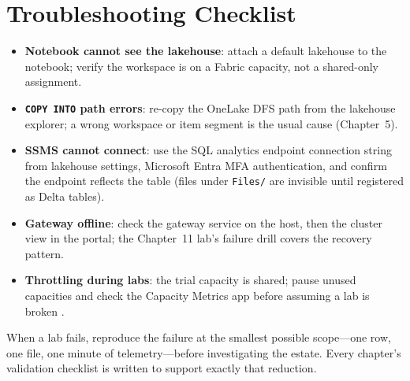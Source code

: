 \section{Troubleshooting Checklist}
%
\begin{itemize}
    \item \textbf{Notebook cannot see the lakehouse}: attach a default lakehouse to the notebook; verify
    the workspace is on a Fabric capacity, not a shared-only assignment.
    \item \textbf{\texttt{COPY INTO} path errors}: re-copy the OneLake DFS path from the lakehouse
    explorer; a wrong workspace or item segment is the usual cause (Chapter~5).
    \item \textbf{SSMS cannot connect}: use the SQL analytics endpoint connection string from lakehouse
    settings, Microsoft Entra MFA authentication, and confirm the endpoint reflects the table
    (files under \texttt{Files/} are invisible until registered as Delta tables).
    \item \textbf{Gateway offline}: check the gateway service on the host, then the cluster view in the
    portal; the Chapter~11 lab's failure drill covers the recovery pattern.
    \item \textbf{Throttling during labs}: the trial capacity is shared; pause unused capacities and
    check the Capacity Metrics app before assuming a lab is broken \cite{microsoftFabricMetricsApp}.
\end{itemize}

\begin{tipbox}
When a lab fails, reproduce the failure at the smallest possible scope---one row, one file, one
minute of telemetry---before investigating the estate. Every chapter's validation checklist is
written to support exactly that reduction.
\end{tipbox}

